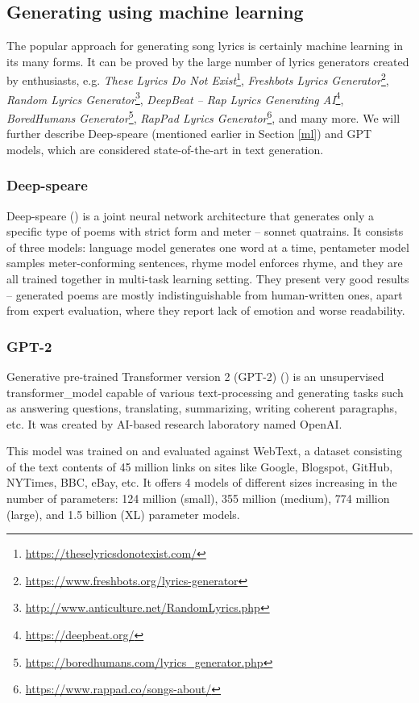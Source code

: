 \subsection{Generating using machine learning}
The popular approach for generating song lyrics is certainly machine learning in its many forms. It can be proved by the large number of lyrics generators created by enthusiasts, e.g. \textit{These Lyrics Do Not Exist}\footnote{\url{https://theselyricsdonotexist.com/}}, \textit{Freshbots Lyrics Generator}\footnote{\url{https://www.freshbots.org/lyrics-generator}}, \textit{Random Lyrics Generator}\footnote{\url{http://www.anticulture.net/RandomLyrics.php}}, \textit{DeepBeat -- Rap Lyrics Generating AI}\footnote{\url{https://deepbeat.org/}}, \textit{BoredHumans Generator}\footnote{\url{https://boredhumans.com/lyrics_generator.php}}, \textit{RapPad Lyrics Generator}\footnote{\url{https://www.rappad.co/songs-about/}}, and many more. We will further describe Deep-speare (mentioned earlier in Section \ref{ml}) and GPT models, which are considered state-of-the-art in text generation.


\subsubsection*{Deep-speare}
Deep-speare (\cite{lau2018deep}) is a joint neural network architecture that generates only a specific type of poems with strict form and meter -- \gls{sonnet} \gls{quatrain}s. It consists of three models: language model generates one word at a time, pentameter model samples meter-conforming sentences, rhyme model enforces rhyme, and they are all trained together in multi-task learning setting. They present very good results -- generated poems are mostly indistinguishable from human-written ones, apart from expert evaluation, where they report lack of emotion and worse readability.

\subsubsection*{GPT-2}
Generative pre-trained Transformer version 2 (GPT-2) (\cite{radford2019gpt2}) is an unsupervised \gls{transformer_model} capable of various text-processing and generating tasks such as answering questions, translating, summarizing, writing coherent paragraphs, etc. It was created by AI-based research laboratory named OpenAI.

This model was trained on and evaluated against WebText, a dataset consisting of the text contents of 45 million links on sites like Google, Blogspot, GitHub, NYTimes, BBC, eBay, etc. It offers 4 models of different sizes increasing in the number of parameters: 124 million (small), 355 million (medium), 774 million (large), and 1.5 billion (XL) parameter models.


